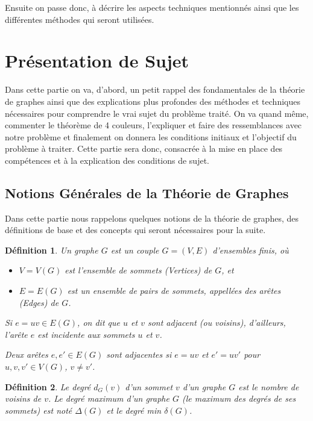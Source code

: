 \documentclass[10pt,a4paper]{article}
\newtheorem{definition}{Définition}
\begin{document}
Ensuite on passe donc, à décrire les aspects techniques mentionnés ainsi que les différentes méthodes qui seront utilisées.
\newpage

\section{Présentation de Sujet}

Dans cette partie on va, d'abord, un petit rappel des fondamentales de la théorie de graphes ainsi que des explications plus profondes des méthodes et techniques nécessaires pour comprendre le vrai sujet du problème traité. On va quand même, commenter le théorème de 4 couleurs, l'expliquer et faire des ressemblances avec notre problème et finalement on donnera les conditions initiaux et l'objectif du problème à traiter. Cette partie sera donc, consacrée à la mise en place des compétences et à la explication des conditions de sujet.

\subsection{Notions Générales de la Théorie de Graphes}

Dans cette partie nous rappelons quelques notions de la théorie de graphes,  des définitions de base et des concepts qui seront nécessaires pour la suite. 

\begin{definition}
Un \emph{graphe} $G$ est un couple $G = (V,E)$ d'ensembles finis, où 
\begin{itemize}
\item $V=V(G)$ est l'ensemble de \emph{sommets (Vertices)} de $G$, et
\item $E=E(G)$ est un ensemble de pairs de sommets, appellées des \emph{arêtes (Edges)} de $G$.
\end{itemize}
Si $e = uv \in E(G)$, on dit que $u$ et $v$ sont \emph{adjacent} (ou \emph{voisins}), d'ailleurs, l'arête $e$ est \emph{incidente} aux sommets $u$ et $v$.

Deux arêtes $e,e'\in E(G)$ sont \emph{adjacentes} si $e=uv$ et $e'=uv'$ pour $u,v,v'\in V(G)$, $v\ne v'$.
\end{definition}

\begin{definition}
Le \emph{degré} $d_{G}(v)$ d'un sommet $v$ d'un graphe $G$ est le nombre de voisins de $v$. Le degré maximum d'un graphe $G$ (le maximum des degrés de ses sommets) est noté $\Delta(G)$ et le degré min $\delta(G)$.
\end{definition}
\end{document}
